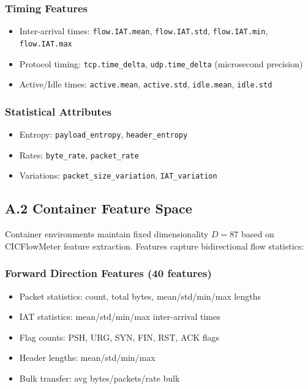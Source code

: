 \documentclass[12pt]{article}
\begin{document}
\subsubsection{Timing Features}
\begin{itemize}
\item Inter-arrival times: \texttt{flow.IAT.mean}, \texttt{flow.IAT.std}, \texttt{flow.IAT.min}, \texttt{flow.IAT.max}
\item Protocol timing: \texttt{tcp.time\_delta}, \texttt{udp.time\_delta} (microsecond precision)
\item Active/Idle times: \texttt{active.mean}, \texttt{active.std}, \texttt{idle.mean}, \texttt{idle.std}
\end{itemize}

\subsubsection{Statistical Attributes}
\begin{itemize}
\item Entropy: \texttt{payload\_entropy}, \texttt{header\_entropy}
\item Rates: \texttt{byte\_rate}, \texttt{packet\_rate}
\item Variations: \texttt{packet\_size\_variation}, \texttt{IAT\_variation}
\end{itemize}

\subsection{A.2 Container Feature Space}

Container environments maintain fixed dimensionality $D=87$ based on CICFlowMeter feature extraction. Features capture bidirectional flow statistics:

\subsubsection{Forward Direction Features (40 features)}
\begin{itemize}
\item Packet statistics: count, total bytes, mean/std/min/max lengths
\item IAT statistics: mean/std/min/max inter-arrival times
\item Flag counts: PSH, URG, SYN, FIN, RST, ACK flags
\item Header lengths: mean/std/min/max
\item Bulk transfer: avg bytes/packets/rate bulk
\end{itemize}
\end{document}
